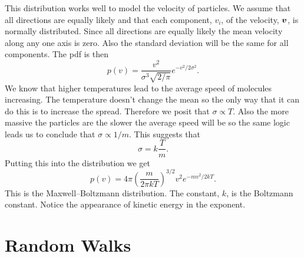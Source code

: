\documentclass[a4paper]{article}
\begin{document}
    This distribution works well to model the velocity of particles.
    We assume that all directions are equally likely and that each component, \(v_i\), of the velocity, \(\bm{v}\), is normally distributed.
    Since all directions are equally likely the mean velocity along any one axis is zero.
    Also the standard deviation will be the same for all components.
    The \gls{pdf} is then
    \[p(v) = \frac{v^2}{\sigma^3\sqrt{2/\pi}}e^{-v^2/2\sigma^2}.\]
    We know that higher temperatures lead to the average speed of molecules increasing.
    The temperature doesn't change the mean so the only way that it can do this is to increase the spread.
    Therefore we posit that \(\sigma\propto T\).
    Also the more massive the particles are the slower the average speed will be so the same logic leads us to conclude that \(\sigma \propto 1/m\).
    This suggests that
    \[\sigma = k\frac{T}{m}.\]
    Putting this into the distribution we get
    \[p(v) = 4\pi \left(\frac{m}{2\pi kT}\right)^{3/2}v^2e^{-mv^2/2kT}.\]
    This is the Maxwell--Boltzmann distribution.
    The constant, \(k\), is the Boltzmann constant.
    Notice the appearance of kinetic energy in the exponent.
    
    \section{Random Walks}
\end{document}
